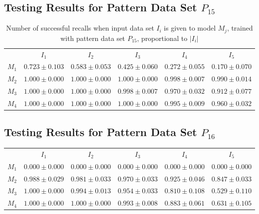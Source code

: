 \documentclass[12pt]{article}
\begin{document}
\begin{appendices}
\subsection{Testing Results for Pattern Data Set $P_{15}$}


    \begin{table}[H]
    \centering
    \def\arraystretch{1.5}
    \footnotesize
    \begin{tabular}{cccccc}
    
 & $I_{1}$  & $I_{2}$  & $I_{3}$  & $I_{4}$  & $I_{5}$ \\ \cline{2-6}
$M_{1}$  & $0.723\pm0.103$  & $0.583\pm0.053$  & $0.425\pm0.060$  & $0.272\pm0.055$  & $0.170\pm0.070$ \\
$M_{2}$  & $1.000\pm0.000$  & $1.000\pm0.000$  & $1.000\pm0.000$  & $0.998\pm0.007$  & $0.990\pm0.014$ \\
$M_{3}$  & $1.000\pm0.000$  & $1.000\pm0.000$  & $0.998\pm0.007$  & $0.970\pm0.032$  & $0.912\pm0.077$ \\
$M_{4}$  & $1.000\pm0.000$  & $1.000\pm0.000$  & $1.000\pm0.000$  & $0.995\pm0.009$  & $0.960\pm0.032$ \\

    \end{tabular}
    \caption{Number of successful recalls when input data set $I_i$ is given to model $M_j$, trained with pattern data set $P_{15}$, proportional to $\left|I_i\right|$}
    \end{table}
    
\subsection{Testing Results for Pattern Data Set $P_{16}$}


    \begin{table}[H]
    \centering
    \def\arraystretch{1.5}
    \footnotesize
    \begin{tabular}{cccccc}
    
 & $I_{1}$  & $I_{2}$  & $I_{3}$  & $I_{4}$  & $I_{5}$ \\ \cline{2-6}
$M_{1}$  & $0.000\pm0.000$  & $0.000\pm0.000$  & $0.000\pm0.000$  & $0.000\pm0.000$  & $0.000\pm0.000$ \\
$M_{2}$  & $0.988\pm0.029$  & $0.981\pm0.033$  & $0.970\pm0.033$  & $0.925\pm0.046$  & $0.847\pm0.033$ \\
$M_{3}$  & $1.000\pm0.000$  & $0.994\pm0.013$  & $0.954\pm0.033$  & $0.810\pm0.108$  & $0.529\pm0.110$ \\
$M_{4}$  & $1.000\pm0.000$  & $1.000\pm0.000$  & $0.993\pm0.008$  & $0.883\pm0.061$  & $0.631\pm0.105$ \\


\end{tabular}
\end{table}
\end{appendices}
\end{document}
